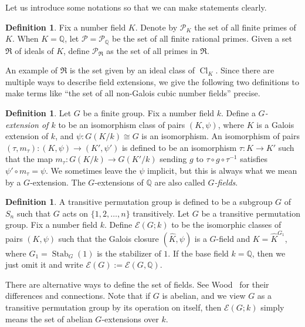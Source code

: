 \documentclass{amsart}
\numberwithin{equation}{section}
\theoremstyle{plain}
\theoremstyle{definition}
\newtheorem{definition}[theorem]{Definition}
\theoremstyle{remark}
\begin{document}
Let us introduce some notations so that we can make statements clearly.
\begin{definition}\label{def:set of primes}
    Fix a number field $K$.
    Denote by $\mathcal{P}_K$ the set of all finite primes of $K$.
    When $K=\mathbb{Q}$, let $\mathcal{P}=\mathcal{P}_{\mathbb{Q}}$ be the set of all finite rational primes.
    Given a set $\mathfrak{R}$ of ideals of $K$, define $\mathcal{P}_{\mathfrak{R}}$ as the set of all primes in $\mathfrak{R}$.
\end{definition} 
An example of $\mathfrak{R}$ is the set given by an ideal class of $\operatorname{Cl}_K$.
Since there are multiple ways to describe field extensions, we give the following two definitions to make terms like ``the set of all non-Galois cubic number fields'' precise. 
\begin{definition}\label{def:Gamma-fields}
    Let $G$ be a finite group.
    Fix a number field $k$.
    Define a \emph{$G$-extension of $k$} to be an isomorphism class of pairs $(K,\psi)$, where $K$ is a Galois extension of $k$, and $\psi:G(K/k)\cong G$ is an isomorphism.  
    An isomorphism of pairs $(\tau,m_\tau):(K,\psi)\to(K',\psi')$ is defined to be an isomorphism $\tau: K\to K'$ such that the map $m_\tau: G(K/k)\to G(K'/k)$ sending $g$ to $\tau\circ g\circ\tau^{-1}$ satisfies $\psi'\circ m_\tau=\psi$.  
    We sometimes leave the $\psi$ implicit, but this is always what we mean by a $G$-extension.  
    The $G$-extensions of $\mathbb{Q}$ are also called \emph{$G$-fields}.
\end{definition}
\begin{definition}\label{def:set of fields}
    A transitive permutation group is defined to be a subgroup $G$ of $S_n$ such that $G$ acts on $\{1,2,\dots,n\}$ transitively.
    Let $G$ be a transitive permutation group.
    Fix a number field $k$.
    Define ${\mathcal{E}}(G;k)$ to be the isomorphic classes of pairs $(K,\psi)$ such that the Galois closure $(\hat{K},\psi)$ is a $G$-field and $K=\hat{K}^{G_1}$, where $G_1=\operatorname{Stab}_G(1)$ is the stabilizer of $1$.
    If the base field $k=\mathbb{Q}$, then we just omit it and write ${\mathcal{E}}(G):={\mathcal{E}}(G,\mathbb{Q})$.
\end{definition}
There are alternative ways to define the set of fields.
See Wood~\cite[p.292]{directions2016} for their differences and connections.
Note that if $G$ is abelian, and we view $G$ as a transitive permutation group by its operation on itself, then $\mathcal{E}(G;k)$ simply means the set of abelian $G$-extensions over $k$.
\end{document}

